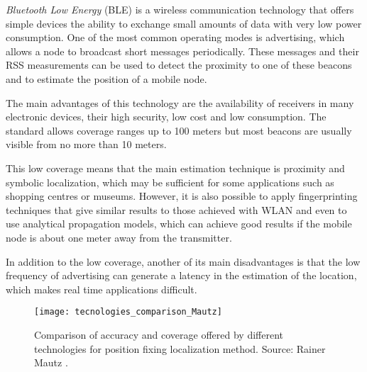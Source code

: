 \begin{description}
	\emph{Bluetooth Low Energy} (BLE) is a wireless communication technology that offers simple devices the ability to exchange small amounts of data with very low power consumption.
	One of the most common operating modes is advertising, which allows a node to broadcast short messages periodically.
	These messages and their RSS measurements can be used to detect the proximity to one of these beacons and to estimate the position of a mobile node.
	
	The main advantages of this technology are the availability of receivers in many electronic devices, their high security, low cost and low consumption.
	The standard allows coverage ranges up to 100 meters but most beacons are usually visible from no more than 10 meters.
	
	This low coverage means that the main estimation technique is proximity and symbolic localization, which may be sufficient for some applications such as shopping centres or museums.
	However, it is also possible to apply fingerprinting techniques that give similar results to those achieved with WLAN and even to use analytical propagation models, which can achieve good results if the mobile node is about one meter away from the transmitter.
	
	In addition to the low coverage, another of its main disadvantages is that the low frequency of advertising can generate a latency in the estimation of the location, which makes real time applications difficult.	
\end{description}
\begin{figure}[!t]
    \centering
	\texttt{[image: tecnologies\_comparison\_Mautz]}    	
	\caption[Comparison of position accuracy and coverage offered by different technologies]{Comparison of accuracy and coverage offered by different technologies for position fixing localization method. Source: Rainer Mautz \cite{mautz_rainer_indoor_2012}.}
	\label{fig:Mautz}
\end{figure}

